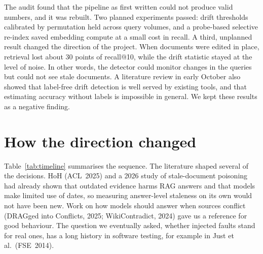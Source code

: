 \documentclass[11pt,a4paper]{article}
\begin{document}
The audit found that the pipeline as first written could not produce valid numbers, and it was
rebuilt. Two planned experiments passed: drift thresholds calibrated by permutation held across query
volumes, and a probe-based selective re-index saved embedding compute at a small cost in recall. A
third, unplanned result changed the direction of the project. When documents were edited in place,
retrieval lost about 30 points of recall@10, while the drift statistic stayed at the level of noise.
In other words, the detector could monitor changes in the queries but could not see stale documents.
A literature review in early October also showed that label-free drift detection is well served by
existing tools, and that estimating accuracy without labels is impossible in general. We kept these
results as a negative finding.

\section{How the direction changed}
Table~\ref{tab:timeline} summarises the sequence. The literature shaped several of the decisions.
HoH (ACL~2025) and a 2026 study of stale-document poisoning had already shown that outdated evidence
harms RAG answers and that models make limited use of dates, so measuring answer-level staleness on
its own would not have been new. Work on how models should answer when sources conflict (DRAGged into
Conflicts, 2025; WikiContradict, 2024) gave us a reference for good behaviour. The question we
eventually asked, whether injected faults stand for real ones, has a long history in software
testing, for example in Just et al.\ (FSE~2014).
\end{document}
